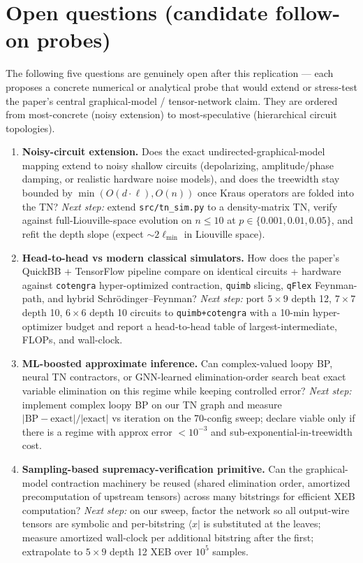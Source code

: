 \section{Open questions (candidate follow-on probes)}

The following five questions are genuinely open after this replication ---
each proposes a concrete numerical or analytical probe that would extend or
stress-test the paper's central graphical-model / tensor-network claim. They
are ordered from most-concrete (noisy extension) to most-speculative
(hierarchical circuit topologies).

\begin{enumerate}
\item \textbf{Noisy-circuit extension.} Does the exact undirected-graphical-model
mapping extend to noisy shallow circuits (depolarizing, amplitude/phase
damping, or realistic hardware noise models), and does the treewidth stay
bounded by $\min(O(d\cdot\ell), O(n))$ once Kraus operators are folded into
the TN? \emph{Next step:} extend \texttt{src/tn\_sim.py} to a density-matrix
TN, verify against full-Liouville-space evolution on $n{\le}10$ at
$p{\in}\{0.001, 0.01, 0.05\}$, and refit the depth slope (expect
$\sim\!2\ell_{\min}$ in Liouville space).

\item \textbf{Head-to-head vs modern classical simulators.} How does the paper's
QuickBB + TensorFlow pipeline compare on identical circuits + hardware
against \texttt{cotengra} hyper-optimized contraction, \texttt{quimb} slicing,
\texttt{qFlex} Feynman-path, and hybrid Schr\"odinger--Feynman? \emph{Next
step:} port $5{\times}9$ depth 12, $7{\times}7$ depth 10, $6{\times}6$ depth
10 circuits to \texttt{quimb+cotengra} with a 10-min hyper-optimizer budget
and report a head-to-head table of largest-intermediate, FLOPs, and
wall-clock.

\item \textbf{ML-boosted approximate inference.} Can complex-valued loopy BP,
neural TN contractors, or GNN-learned elimination-order search beat exact
variable elimination on this regime while keeping controlled error?
\emph{Next step:} implement complex loopy BP on our TN graph and measure
$|\text{BP}-\text{exact}|/|\text{exact}|$ vs iteration on the 70-config
sweep; declare viable only if there is a regime with approx error
$<10^{-3}$ and sub-exponential-in-treewidth cost.

\item \textbf{Sampling-based supremacy-verification primitive.} Can the
graphical-model contraction machinery be reused (shared elimination order,
amortized precomputation of upstream tensors) across many bitstrings for
efficient XEB computation? \emph{Next step:} on our sweep, factor the
network so all output-wire tensors are symbolic and per-bitstring $\langle
x|$ is substituted at the leaves; measure amortized wall-clock per
additional bitstring after the first; extrapolate to $5{\times}9$ depth 12
XEB over $10^5$ samples.


\end{enumerate}
